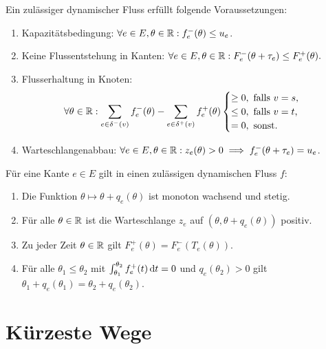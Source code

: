 	\begin{definition}
		Ein zulässiger dynamischer Fluss erfüllt folgende Voraussetzungen:
		\begin{enumerate}[label=(F\arabic*)]
			\item\label{def-feasible-flow-capacity} Kapazitätsbedingung: $\forall e\in E, \theta\in\mathbb{R}: f_e^-(\theta)\leq u_e$.
			\item\label{def-feasible-flow-no-negative-flow} Keine Flussentstehung in Kanten: $\forall e\in E, \theta\in\mathbb{R}: F_e^-(\theta + \tau_e) \leq F_e^+(\theta).$
			\item\label{def-feasible-flow-no-flow-at-node} Flusserhaltung in Knoten:
			\[
			\forall\theta\in\mathbb{R}: \sum_{e\in\delta^-(v)}f^-_e(\theta) - \sum_{e\in\delta^+(v)} f_e^+(\theta) \begin{cases}
				\geq 0, \text{ falls $v=s$,}\\
				\leq 0, \text{ falls $v=t$,}\\
				= 0, \text{ sonst.}
			\end{cases}\]
			\item\label{def-feasible-flow-queue-with-capacity} Warteschlangenabbau:
			$\forall e\in E, \theta\in\mathbb{R}: z_e(\theta) > 0 \implies f_e^-(\theta + \tau_e) = u_e$.
		\end{enumerate}
	\end{definition}
	\begin{proposition}\label{prop-feasible-flow}
		Für eine Kante $e\in E$ gilt in einen zulässigen dynamischen Fluss $f$:
		\begin{enumerate}[label=(\roman*)]
			\item\label{prop-feasible-flow-T-mon-inc-cont} Die Funktion $\theta \mapsto \theta + q_e(\theta)$ ist monoton wachsend und stetig.
			\item\label{prop-feasible-flow-positive-queue} Für alle $\theta\in\mathbb{R}$ ist die Warteschlange $z_e$ auf $(\theta, \theta + q_e(\theta))$ positiv.
			\item\label{prop-feasible-flow-det-outflow} Zu jeder Zeit $\theta\in\mathbb{R}$ gilt $F_e^+(\theta) = F_e^-(T_e(\theta))$.
			\item\label{prop-feasible-flow-queue-delay} Für alle $\theta_1 \leq \theta_2$ mit $\int_{\theta_1}^{\theta_2} f^+_e(t) \mathop{}\!\mathrm{d} t = 0$ und $q_e(\theta_2)>0$ gilt $\theta_1 + q_e(\theta_1) = \theta_2 + q_e(\theta_2)$.
		\end{enumerate}
	\end{proposition}

\section{Kürzeste Wege}

